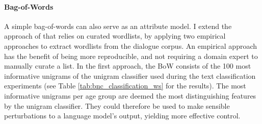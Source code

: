 \paragraph{Bag-of-Words} A simple bag-of-words can also serve as an attribute model. 
I extend the approach of \cite{dathathri2019plug} that relies on curated wordlists, by applying two empirical approaches to extract wordlists from the dialogue corpus. An empirical approach has the benefit of being more reproducible, and not requiring a domain expert to manually curate a list. In the first approach, the BoW consists of the 100 most informative unigrams of the unigram classifier used during the text classification experiments (see Table \ref{tab:bnc_classification_ws} for the results). The most informative unigrams per age group are deemed the most distinguishing features by the unigram classifier. They could therefore be used to make sensible perturbations to a language model's output, yielding more effective control.

